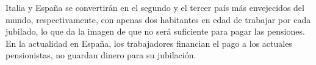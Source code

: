 \vspace{-0.5cm}

\noindent \textbf{\checkmark} Italia y Espa\~na se convertir\'an en el segundo y el tercer pa\'is m\'as envejecidos del mundo, respectivamente, con apenas dos habitantes en edad de trabajar por cada jubilado, lo que da la imagen de que no ser\'a suficiente para pagar las pensiones. En la actualidad en Espa\~na, los trabajadores financian el pago a los actuales pensionistas, no guardan dinero para su jubilaci\'on.\\

